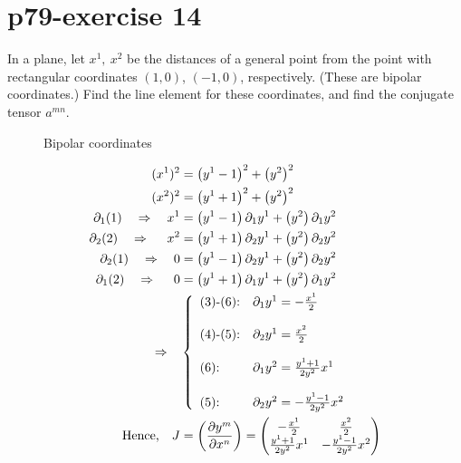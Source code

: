 \section{p79-exercise 14}
\begin{tcolorbox}
In a plane, let $x^1, \  x^2$ be the distances of a general point from the point with rectangular coordinates $(1,0)$, $(-1,0)$, respectively. (These are bipolar coordinates.) Find the line element for these coordinates, and find the conjugate tensor $a^{mn}$.
\end{tcolorbox}
\begin{figure}[h]

\caption{Bipolar coordinates}
\label{fig:fig_p79_260_a}
\end{figure}
\begin{align}
\ (x^1)^2 &= \left( y^1-1\right) ^2 + \left(y^2\right)^2\\
\ (x^2)^2 &= \left( y^1+1\right) ^2 + \left(y^2\right)^2\\
\partial_1 (1) \quad\Rightarrow \quad x^1 &= \left( y^1-1\right)\partial_1 y^1  + \left(y^2\right)\partial_1 y^2\\
\partial_2 (2) \quad\Rightarrow \quad\ x^2 &= \left( y^1+1\right)\partial_2 y^1  + \left(y^2\right)\partial_2 y^2\\
\partial_2 (1) \quad\Rightarrow \quad 0 &= \left( y^1-1\right)\partial_2 y^1  + \left(y^2\right)\partial_2 y^2\\
\partial_1 (2) \quad\Rightarrow \quad\ 0 &= \left( y^1+1\right)\partial_1 y^1  + \left(y^2\right)\partial_1 y^2\\
\Rightarrow \quad & \left\{\begin{array}{ll}
\text{(3)-(6):}& \partial_1 y^1 = -\frac{x^1}{2}\\\\
\text{(4)-(5):}& \partial_2 y^1 = \frac{x^2}{2}\\\\
\text{(6):}& \partial_1 y^2 = \frac{y^1+1}{2y^2}x^1\\\\
\text{(5):}& \partial_2 y^2 = -\frac{y^1-1}{2y^2}x^2\\
\end{array}\right.\\
\text{Hence,}\quad J &= \left(\pdv{y^m}{x^n} \right) = \begin{pmatrix}
-\frac{x^1}{2} &\frac{x^2}{2}  \\
\frac{y^1+1}{2y^2}x^1 & -\frac{y^1-1}{2y^2}x^2 \\
\end{pmatrix}
\end{align}
